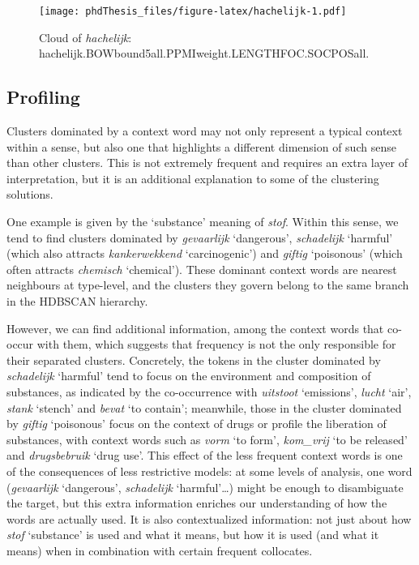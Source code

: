 \documentclass[
]{book}
\begin{document}
\begin{figure}
\centering
\texttt{[image: phdThesis\_files/figure-latex/hachelijk-1.pdf]}
\caption{\label{fig:hachelijk}Cloud of \emph{hachelijk}: hachelijk.BOWbound5all.PPMIweight.LENGTHFOC.SOCPOSall.}
\end{figure}

\hypertarget{profiling}{%
\subsection{Profiling}\label{profiling}}

Clusters dominated by a context word may not only represent a typical context within a sense, but also one that highlights a different dimension of such sense than other clusters. This is not extremely frequent and requires an extra layer of interpretation, but it is an additional explanation to some of the clustering solutions.

One example is given by the `substance' meaning of \emph{stof}.
Within this sense, we tend to find clusters dominated by \emph{gevaarlijk} `dangerous', \emph{schadelijk} `harmful' (which also attracts \emph{kankerwekkend} `carcinogenic') and \emph{giftig} `poisonous' (which often attracts \emph{chemisch} `chemical'). These dominant context words are nearest neighbours at type-level, and the clusters they govern belong to the same branch in the HDBSCAN hierarchy.

However, we can find additional information, among the context words that co-occur with them, which suggests that frequency is not the only responsible for their separated clusters. Concretely, the tokens in the cluster dominated by \emph{schadelijk} `harmful' tend to focus on the environment and composition of substances, as indicated by the co-occurrence with \emph{uitstoot} `emissions', \emph{lucht} `air', \emph{stank} `stench' and \emph{bevat} `to contain'; meanwhile, those in the cluster dominated by \emph{giftig} `poisonous' focus on the context of drugs or profile the liberation of substances, with context words such as \emph{vorm} `to form', \emph{kom\_vrij} `to be released' and \emph{drugsbebruik} `drug use'.
This effect of the less frequent context words is one of the consequences of less restrictive models: at some levels of analysis, one word (\emph{gevaarlijk} `dangerous', \emph{schadelijk} `harmful'\ldots) might be enough to disambiguate the target, but this extra information enriches our understanding of how the words are actually used. It is also contextualized information: not just about how \emph{stof} `substance' is used and what it means, but how it is used (and what it means) when in combination with certain frequent collocates.
\end{document}

